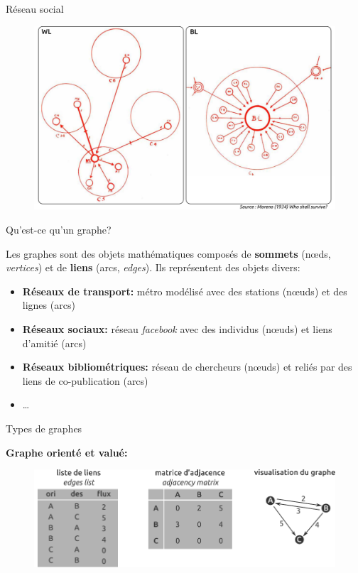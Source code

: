 \begin{frame}{Réseau social}

\begin{figure}
  \includegraphics[width=12cm]{Moreno.pdf}
\end{figure}

\end{frame}


\begin{frame}{Qu'est-ce qu'un graphe?}

Les graphes sont des objets mathématiques composés de \textbf{sommets} (n{\oe}ds, \textit{vertices}) et de \textbf{liens} (arcs, \textit{edges}). Ils représentent des objets divers:

\begin{itemize} 
  \item \textbf{Réseaux de transport:} métro modélisé avec des stations (n{\oe}uds) et des lignes (arcs)
  \item \textbf{Réseaux sociaux:} réseau \textit{facebook} avec des individus (n{\oe}uds) et liens d'amitié (arcs)
  \item \textbf{Réseaux bibliométriques:} réseau de chercheurs (n{\oe}uds) et reliés par des liens de co-publication (arcs)
  \item \ldots
\end{itemize}

\end{frame}



\begin{frame}{Types de graphes}

\textbf{Graphe orienté et valué:}

\begin{figure}
  \includegraphics[width=12cm]{MatGraph1.pdf}
\end{figure}

\end{frame}


